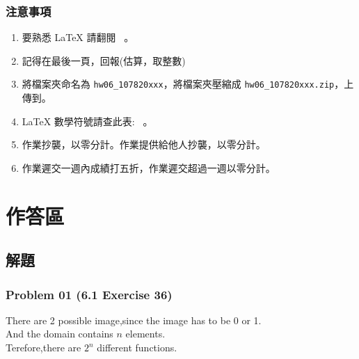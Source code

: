 \documentclass[14pt,hyperref={bookmarks=false}]{beamer}
\begin{document}
	\begin{frame}
	\frametitle{注意事項}
	\fontsize{10}{10pt}\selectfont
	\begin{enumerate}[label=(\alph*)]
	\item 要熟悉 LaTeX 請翻閱 \ 。
	\item 記得在最後一頁，回報\selectfont \color{red}{完成作業小時數}(估算，取整數)\selectfont \color{black}{。}
	\item 將檔案夾命名為 \texttt{hw06\_107820xxx}，將檔案夾壓縮成 \texttt{hw06\_107820xxx.zip}，上傳到。
	\item LaTeX 數學符號請查此表: \ 。
	\item 作業抄襲，以零分計。作業提供給他人抄襲，以零分計。
	\item 作業遲交一週內成績打五折，作業遲交超過一週以零分計。
	\end{enumerate}
	\end{frame}

\section{作答區}

	\subsection{解題}
	
	\begin{frame}
	\frametitle{Problem 01 (6.1 Exercise 36)}
	\fontsize{12}{16pt}\selectfont
	There are 2 possible image,since the image has to be 0 or 1.\\
	 And the domain contains $n$ elements.\\
	 Terefore,there are $2^n$ different functions.\\
	
	\end{frame}
	
\end{document}
